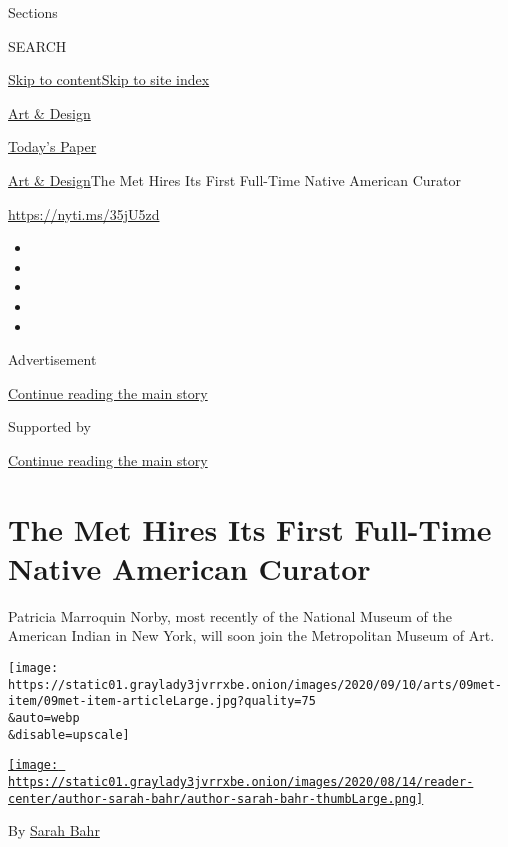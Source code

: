 Sections

SEARCH

\protect\hyperlink{site-content}{Skip to
content}\protect\hyperlink{site-index}{Skip to site index}

\href{https://www.nytimes3xbfgragh.onion/section/arts/design}{Art \&
Design}

\href{https://myaccount.nytimes3xbfgragh.onion/auth/login?response_type=cookie\&client_id=vi}{}

\href{https://www.nytimes3xbfgragh.onion/section/todayspaper}{Today's
Paper}

\href{/section/arts/design}{Art \& Design}\textbar{}The Met Hires Its
First Full-Time Native American Curator

\url{https://nyti.ms/35jU5zd}

\begin{itemize}
\item
\item
\item
\item
\item
\end{itemize}

Advertisement

\protect\hyperlink{after-top}{Continue reading the main story}

Supported by

\protect\hyperlink{after-sponsor}{Continue reading the main story}

\hypertarget{the-met-hires-its-first-full-time-native-american-curator}{%
\section{The Met Hires Its First Full-Time Native American
Curator}\label{the-met-hires-its-first-full-time-native-american-curator}}

Patricia Marroquin Norby, most recently of the National Museum of the
American Indian in New York, will soon join the Metropolitan Museum of
Art.

\texttt{[image: https://static01.graylady3jvrrxbe.onion/images/2020/09/10/arts/09met-item/09met-item-articleLarge.jpg?quality=75\\\&auto=webp\\\&disable=upscale]}

\href{https://www.nytimes3xbfgragh.onion/by/sarah-bahr}{\texttt{[image: https://static01.graylady3jvrrxbe.onion/images/2020/08/14/reader-center/author-sarah-bahr/author-sarah-bahr-thumbLarge.png]}}

By \href{https://www.nytimes3xbfgragh.onion/by/sarah-bahr}{Sarah Bahr}

